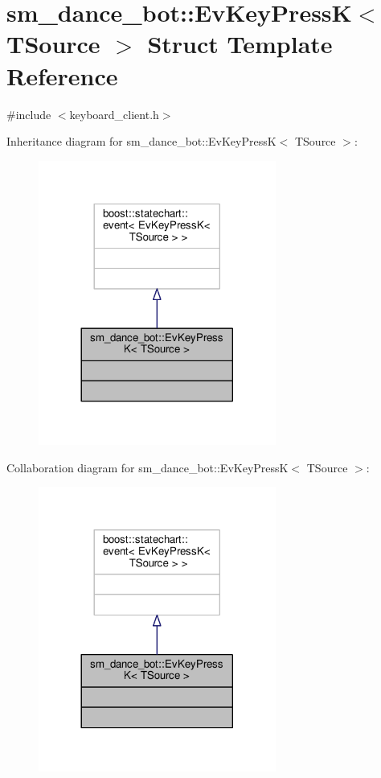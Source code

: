 \hypertarget{structsm__dance__bot_1_1EvKeyPressK}{}\section{sm\+\_\+dance\+\_\+bot\+:\+:Ev\+Key\+PressK$<$ T\+Source $>$ Struct Template Reference}
\label{structsm__dance__bot_1_1EvKeyPressK}


{\ttfamily \#include $<$keyboard\+\_\+client.\+h$>$}



Inheritance diagram for sm\+\_\+dance\+\_\+bot\+:\+:Ev\+Key\+PressK$<$ T\+Source $>$\+:
\nopagebreak
\begin{figure}[H]
\begin{center}
\leavevmode
\includegraphics[width=221pt]{structsm__dance__bot_1_1EvKeyPressK__inherit__graph}
\end{center}
\end{figure}


Collaboration diagram for sm\+\_\+dance\+\_\+bot\+:\+:Ev\+Key\+PressK$<$ T\+Source $>$\+:
\nopagebreak
\begin{figure}[H]
\begin{center}
\leavevmode
\includegraphics[width=221pt]{structsm__dance__bot_1_1EvKeyPressK__coll__graph}
\end{center}
\end{figure}


